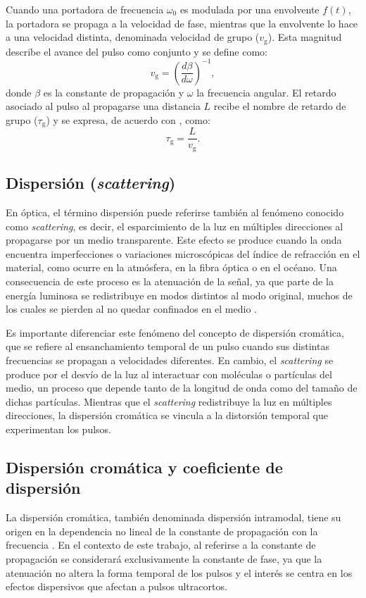 Cuando una portadora de frecuencia $\omega_{0}$ es modulada por una envolvente $f(t)$, la portadora se propaga a la velocidad de fase, mientras que la envolvente lo hace a una velocidad distinta, denominada velocidad de grupo ($v_\mathrm{g}$). Esta magnitud describe el avance del pulso como conjunto y se define como:
\begin{equation}
v_\mathrm{g} = \left( \frac{d\beta}{d\omega} \right)^{-1},
\end{equation}
donde $\beta$ es la constante de propagación y $\omega$ la frecuencia angular.
El retardo asociado al pulso al propagarse una distancia $L$ recibe el nombre de retardo de grupo ($\tau_\mathrm{g}$) y se expresa, de acuerdo con \cite{España}, como:
\begin{equation}
\tau_\mathrm{g} = \frac{L}{v_\mathrm{g}}.
\end{equation}


\subsection{Dispersión (\textit{scattering})}
En óptica, el término dispersión puede referirse también al fenómeno conocido como \textit{scattering}, es decir, el esparcimiento de la luz en múltiples direcciones al propagarse por un medio transparente. Este efecto se produce cuando la onda encuentra imperfecciones o variaciones microscópicas del índice de refracción en el material, como ocurre en la atmósfera, en la fibra óptica o en el océano. Una consecuencia de este proceso es la atenuación de la señal, ya que parte de la energía luminosa se redistribuye en modos distintos al modo original, muchos de los cuales se pierden al no quedar confinados en el medio \cite{España}.

Es importante diferenciar este fenómeno del concepto de dispersión cromática, que se refiere al ensanchamiento temporal de un pulso cuando sus distintas frecuencias se propagan a velocidades diferentes. En cambio, el \textit{scattering} se produce por el desvío de la luz al interactuar con moléculas o partículas del medio, un proceso que depende tanto de la longitud de onda como del tamaño de dichas partículas. Mientras que el \textit{scattering} redistribuye la luz en múltiples direcciones, la dispersión cromática se vincula a la distorsión temporal que experimentan los pulsos.

\subsection{Dispersión cromática y coeficiente de dispersión}
La dispersión cromática, también denominada dispersión intramodal, tiene su origen en la dependencia no lineal de la constante de propagación con la frecuencia \cite{España}. En el contexto de este trabajo, al referirse a la constante de propagación se considerará exclusivamente la constante de fase, ya que la atenuación no altera la forma temporal de los pulsos y el interés se centra en los efectos dispersivos que afectan a pulsos ultracortos.

